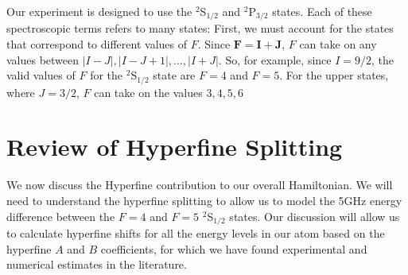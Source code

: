 Our experiment is designed to use the $^2$S$_{1/2}$ and $^2$P$_{3/2}$ states. Each of these spectroscopic terms refers to many states: First, we must account for the states that correspond to different values of $F$. Since $\mathbf{F}=\mathbf{I}+\mathbf{J}$, $F$ can take on any values between $|I-J|,|I-J+1|,...,|I+J|$. So, for example, since $I=9/2$, the valid values of $F$ for the $^2$S$_{1/2}$ state are $F=4$ and $F=5$. For the upper states, where $J=3/2$, $F$ can take on the values $3,4,5,6$ 

%


\section{Review of Hyperfine Splitting}

We now discuss the Hyperfine contribution to our overall Hamiltonian. We will need to understand the hyperfine splitting to allow us to model the 5GHz energy difference between the $F=4$ and $F=5$ $^2$S$_{1/2}$ states. Our discussion will allow us to calculate hyperfine shifts for all the energy levels in our atom based on the hyperfine $A$ and $B$ coefficients, for which we have found experimental and numerical estimates in the literature.

